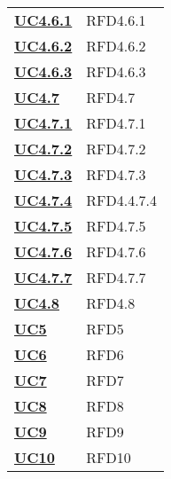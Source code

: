 \begin{longtable}[H]{| >{\centering\bfseries}p{8cm} | >{\centering\arraybackslash}p{8cm} |}
    \hyperref[par:uc4.6.1]{UC4.6.1} & RFD4.6.1 \\

    \hyperref[par:uc4.6.2]{UC4.6.2} & RFD4.6.2 \\

    \hyperref[par:uc4.6.3]{UC4.6.3} & RFD4.6.3 \\


    \hyperref[ssub:uc4.7]{UC4.7} & RFD4.7 \\

    \hyperref[par:uc4.7.1]{UC4.7.1} & RFD4.7.1 \\

    \hyperref[par:uc4.7.2]{UC4.7.2} & RFD4.7.2 \\

    \hyperref[par:uc4.7.3]{UC4.7.3} & RFD4.7.3 \\

    \hyperref[par:uc4.7.4]{UC4.7.4} & RFD4.4.7.4 \\

    \hyperref[par:uc4.7.5]{UC4.7.5} & RFD4.7.5 \\

    \hyperref[par:uc4.7.6]{UC4.7.6} & RFD4.7.6 \\

    \hyperref[par:uc4.7.7]{UC4.7.7} & RFD4.7.7 \\

    \hyperref[ssub:uc4.8]{UC4.8} & RFD4.8 \\

    \hyperref[sub:uc5]{UC5} & RFD5 \\

    \hyperref[sub:uc6]{UC6} & RFD6 \\

    \hyperref[sub:uc7]{UC7} & RFD7 \\

    \hyperref[sub:uc8]{UC8} & RFD8 \\

    \hyperref[sub:uc9]{UC9} & RFD9 \\

    \hyperref[sub:uc10]{UC10} & RFD10 \\

\end{longtable}
